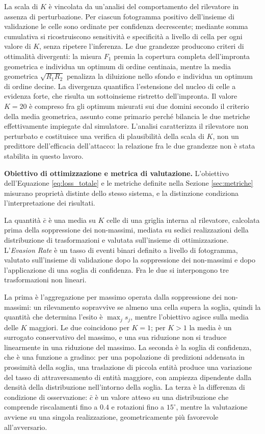 \documentclass[a4paper,12pt]{report}
\begin{document}
La scala di $K$ è vincolata da un'analisi del comportamento del rilevatore in
assenza di perturbazione. Per ciascun fotogramma positivo dell'insieme di
validazione le celle sono ordinate per confidenza decrescente; mediante somma
cumulativa si ricostruiscono sensitività e specificità a livello di cella per
ogni valore di $K$, senza ripetere l'inferenza. Le due grandezze producono
criteri di ottimalità divergenti: la misura $F_1$ premia la copertura completa
dell'impronta geometrica e individua un optimum di ordine centinaia, mentre la
media geometrica $\sqrt{R_1 R_2}$ penalizza la diluizione nello sfondo e
individua un optimum di ordine decine. La divergenza quantifica l'estensione del
nucleo di celle a evidenza forte, che risulta un sottoinsieme ristretto
dell'impronta. Il valore $K = 20$ è compreso fra gli optimum misurati sui due
domini secondo il criterio della media geometrica, assunto come primario perché
bilancia le due metriche effettivamente impiegate dal simulatore. L'analisi
caratterizza il rilevatore non perturbato e costituisce una verifica di
plausibilità della scala di $K$, non un predittore dell'efficacia dell'attacco:
la relazione fra le due grandezze non è stata stabilita in questo lavoro.

\textbf{Obiettivo di ottimizzazione e metrica di valutazione.}
\label{sec:divario}
L'obiettivo dell'Equazione \ref{eq:loss_totale} e le metriche definite nella
Sezione \ref{sec:metriche} misurano proprietà distinte dello stesso sistema, e
la distinzione condiziona l'interpretazione dei risultati.

La quantità $\bar{c}$ è una media su $K$ celle di una griglia interna al
rilevatore, calcolata prima della soppressione dei non-massimi, mediata su
sedici realizzazioni della distribuzione di trasformazioni e valutata
sull'insieme di ottimizzazione. L'\textit{Evasion Rate} è un tasso di eventi
binari definito a livello di fotogramma, valutato sull'insieme di validazione
dopo la soppressione dei non-massimi e dopo l'applicazione di una soglia di
confidenza. Fra le due si interpongono tre trasformazioni non lineari.

La prima è l'aggregazione per massimo operata dalla soppressione dei
non-massimi: un rilevamento sopravvive se almeno una cella supera la soglia,
quindi la quantità che determina l'esito è $\max_j s_j$, mentre l'obiettivo
agisce sulla media delle $K$ maggiori. Le due coincidono per $K = 1$; per $K >
1$ la media è un surrogato conservativo del massimo, e una sua riduzione non si
traduce linearmente in una riduzione del massimo. La seconda è la soglia di
confidenza, che è una funzione a gradino: per una popolazione di predizioni
addensata in prossimità della soglia, una traslazione di piccola entità produce
una variazione del tasso di attraversamento di entità maggiore, con ampiezza
dipendente dalla densità della distribuzione nell'intorno della soglia. La terza
è la differenza di condizione di osservazione: $\bar{c}$ è un valore atteso su
una distribuzione che comprende riscalamenti fino a $0.4$ e rotazioni fino a
$15^\circ$, mentre la valutazione avviene su una singola realizzazione,
geometricamente più favorevole all'avversario.
\end{document}

